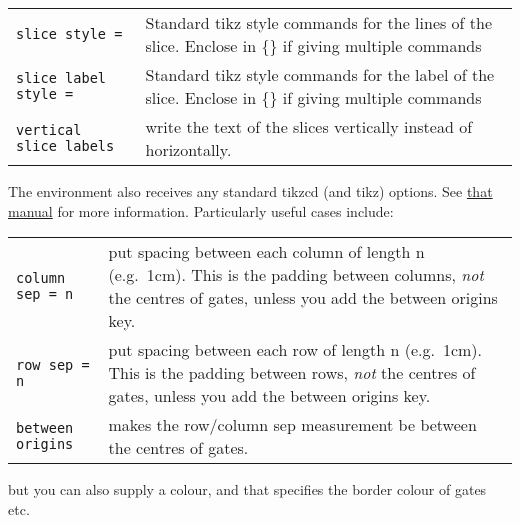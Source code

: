 \documentclass[aps,pra,10pt,nofootinbib]{revtex4-2}
\begin{document}
\begin{description}[style=nextline]
\begin{tabular}{p{4cm}p{10cm}}
          \texttt{slice style =}         & Standard tikz style commands for the lines of the slice. Enclose in \{\} if giving multiple commands                                                                                                                                                        \\
          \texttt{slice label style =}   & Standard tikz style commands for the label of the slice. Enclose in \{\} if giving multiple commands                                                                                                                                                        \\
          \texttt{vertical slice labels} & write the text of the slices vertically instead of horizontally.                                                                                                                                                                                            \\
        \end{tabular}

        The environment also receives any standard tikzcd (and tikz) options. See \href{http://mirrors.ctan.org/graphics/pgf/contrib/tikz-cd/tikz-cd-doc.pdf}{that manual} for more information. Particularly useful cases include:

        \begin{tabular}{p{4cm}p{10cm}}
          \texttt{column sep = n}  & put spacing between each column of length n (e.g.\ 1cm). This is the padding between columns, \emph{not} the centres of gates, unless you add the between origins key. \\
          \texttt{row sep = n}     & put spacing between each row of length n (e.g.\ 1cm). This is the padding between rows, \emph{not} the centres of gates, unless you add the between origins key.       \\
          \texttt{between origins} & makes the row/column sep measurement be between the centres of gates.
        \end{tabular}

        but you can also supply a colour, and that specifies the border colour of gates etc.


\end{description}
\end{document}

